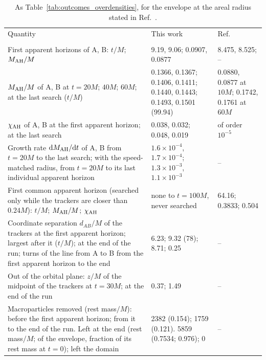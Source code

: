 \begin{table}
\caption{As Table~\ref{tab:outcomes_overdensities}, for the envelope at the areal radius stated in Ref.~\cite{Wu:2026nrpic}.}
\label{tab:outcomes_overdensities_stated}
\footnotesize
\setlength{\tabcolsep}{3pt}
\begin{ruledtabular}
\begin{tabular}{p{}p{}p{}}
Quantity & This work & Ref.~\cite{Wu:2026nrpic} \tabularnewline
\colrule
\multicolumn{3}{l}{\textit{Envelope at the stated areal radius $30M$}} \tabularnewline
\raggedright First apparent horizons of A, B: $t/M$; $M_{\rm AH}/M$ & \raggedright 9.19, 9.06; 0.0907, 0.0877 & \raggedright 8.475, 8.525; -- \tabularnewline
\raggedright $M_{\rm AH}/M$ of A, B at $t=20M$; $40M$; $60M$; at the last search ($t/M$) & \raggedright 0.1366, 0.1367; 0.1406, 0.1411; 0.1440, 0.1443; 0.1493, 0.1501 (99.94) & \raggedright 0.0880, 0.0877 at $10M$; 0.1742, 0.1761 at $60M$ \tabularnewline
\raggedright $\chi_{\rm AH}$ of A, B at the first apparent horizon; at the last search & \raggedright 0.038, 0.032; 0.048, 0.019 & \raggedright of order $10^{-5}$ \tabularnewline
\raggedright Growth rate $\mathrm{d} M_{\rm AH}/\mathrm{d} t$ of A, B from $t=20M$ to the last search; with the speed-matched radius, from $t=20M$ to its last individual apparent horizon & \raggedright $1.6\times10^{-4}$, $1.7\times10^{-4}$; $1.3\times10^{-3}$, $1.1\times10^{-3}$ & \raggedright -- \tabularnewline
\raggedright First common apparent horizon (searched only while the trackers are closer than $0.24M$): $t/M$; $M_{\rm AH}/M$; $\chi_{\rm AH}$ & \raggedright none to $t=100M$, never searched & \raggedright 64.16; 0.3833; 0.504 \tabularnewline
\raggedright Coordinate separation $d_{AB}/M$ of the trackers at the first apparent horizon; largest after it ($t/M$); at the end of the run; turns of the line from A to B from the first apparent horizon to the end & \raggedright 6.23; 9.32 (78); 8.71; 0.25 & \raggedright -- \tabularnewline
\raggedright Out of the orbital plane: $z/M$ of the midpoint of the trackers at $t=30M$; at the end of the run & \raggedright 0.37; 1.49 & \raggedright -- \tabularnewline
\raggedright Macroparticles removed (rest mass$/M$): before the first apparent horizon; from it to the end of the run. Left at the end (rest mass$/M$; of the envelope, fraction of its rest mass at $t=0$); left the domain & \raggedright 2382 (0.154); 1759 (0.121). 5859 (0.7534; 0.976); 0 & \raggedright -- \tabularnewline
\end{tabular}
\end{ruledtabular}
\end{table}
